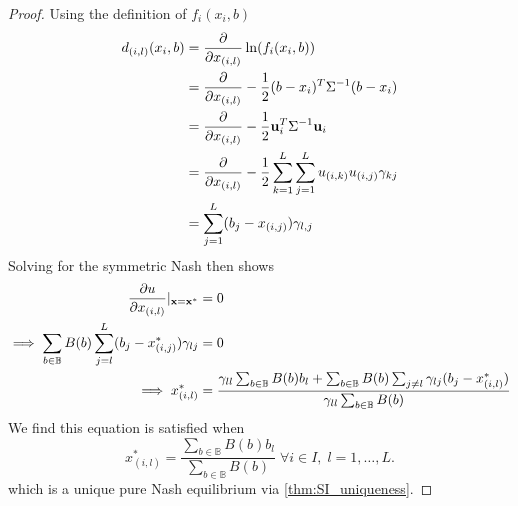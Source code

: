 \documentclass{article}
\newcommand {\B}{\mathbb{B}}
\begin{document}
            \begin{proof}
                Using the definition of $f_i(x_i,b)$
                \begin{align}
                    d_{(i,l)}(x_i,b)&= \pdv{}{x_{(i,l)}}\ln(f_{i}(x_i,b)) \\ %
                    &=\pdv{}{x_{(i,l)}}-\frac{1}{2}(b-x_i)^T\Sigma^{-1}(b-x_i) \\ %
                    &=\pdv{}{x_{(i,l)}}-\frac{1}{2}\mathbf{u}_i^T\Sigma^{-1}\mathbf{u}_i \\ %
                    &=\pdv{}{x_{(i,l)}}-\frac{1}{2}\sum_{k=1}^{L}\sum_{j=1}^{L}u_{(i,k)}u_{(i,j)}\gamma_{kj} \\ %
                    &=\sum_{j=1}^{L}(b_j-x_{(i,j)})\gamma_{l,j}
                \end{align}
                Solving for the symmetric Nash then shows
                \begin{align}
                    \pdv{u}{x_{(i,l)}}|_{\mathbf{x}=\mathbf{x}^*}&=0 \\ %
                    \implies \sum_{b\in \B} B(b) \sum_{j=l}^{L}(b_j-x_{(i,j)}^*)\gamma_{lj}&=0 \\ %
                    \implies x_{(i,l)}^*&=\frac{\gamma_{ll}\sum_{b\in\B} B(b)b_l+\sum_{b\in\B} B(b)\sum_{j\neq l}\gamma_{lj}(b_j-x_{(i,l)}^*)}{\gamma_{ll}\sum_{b\in\B}B(b)}
                \end{align}
                We find this equation is satisfied when 
                \begin{equation}
                    x_{(i,l)}^*=\frac{\sum_{b\in \B}B(b) b_{l}}{\sum_{b\in \B}B(b)}\; \forall i\in I,\; l=1,\dots,L.
                \end{equation}
                which is a unique pure Nash equilibrium via \cref{thm:SI_uniqueness}.
            \end{proof}
            
\end{document}
